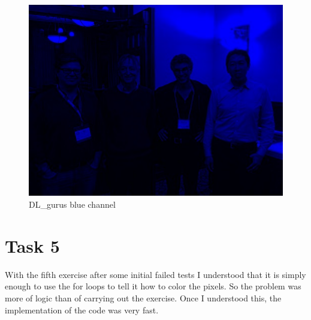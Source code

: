\begin{figure}[h]
        \begin{minipage}{0.45\textwidth}
        		\centering
		\includegraphics[width=\linewidth]{images/source/task4/3/3}
		\caption{DL\_gurus blue channel}
		\label{fig:1b}
        \end{minipage}
\end{figure}


\chapter{Task 5}
With the fifth exercise after some initial failed tests I understood that it is simply enough to use the for loops to tell it how to color the pixels. So the problem was more of logic than of carrying out the exercise.
Once I understood this, the implementation of the code was very fast.

